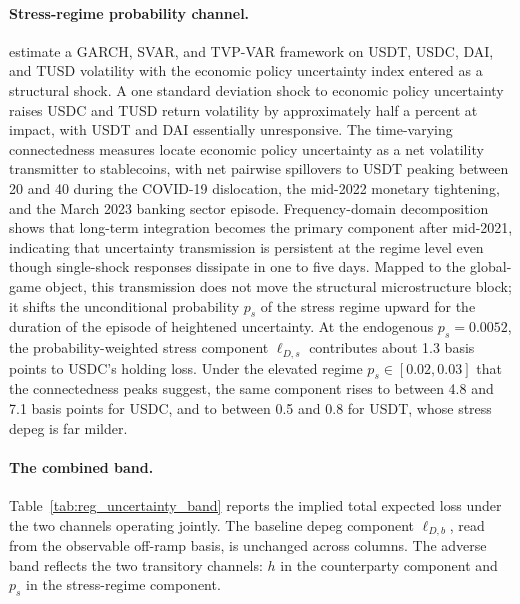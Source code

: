 \paragraph{Stress-regime probability channel.} \citet{alasadi_bewaji_gugnani_gupta_heijmans_2025} estimate a GARCH, SVAR, and TVP-VAR framework on USDT, USDC, DAI, and TUSD volatility with the \citet{baker_bloom_davis_2016} economic policy uncertainty index entered as a structural shock. A one standard deviation shock to economic policy uncertainty raises USDC and TUSD return volatility by approximately half a percent at impact, with USDT and DAI essentially unresponsive. The time-varying connectedness measures locate economic policy uncertainty as a net volatility transmitter to stablecoins, with net pairwise spillovers to USDT peaking between 20 and 40 during the COVID-19 dislocation, the mid-2022 monetary tightening, and the March 2023 banking sector episode. Frequency-domain decomposition shows that long-term integration becomes the primary component after mid-2021, indicating that uncertainty transmission is persistent at the regime level even though single-shock responses dissipate in one to five days. Mapped to the global-game object, this transmission does not move the structural microstructure block; it shifts the unconditional probability $p_s$ of the stress regime upward for the duration of the episode of heightened uncertainty. At the endogenous $p_s = 0.0052$, the probability-weighted stress component $\ell_{D,s}$ contributes about 1.3 basis points to USDC's holding loss. Under the elevated regime $p_s \in [0.02, 0.03]$ that the connectedness peaks suggest, the same component rises to between 4.8 and 7.1 basis points for USDC, and to between 0.5 and 0.8 for USDT, whose stress depeg is far milder.

\paragraph{The combined band.} Table~\ref{tab:reg_uncertainty_band} reports the implied total expected loss under the two channels operating jointly. The baseline depeg component $\ell_{D,b}$, read from the observable off-ramp basis, is unchanged across columns. The adverse band reflects the two transitory channels: $h$ in the counterparty component and $p_s$ in the stress-regime component.


